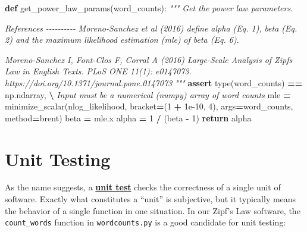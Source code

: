 \documentclass[
]{krantz}
\makeatletter
\newenvironment{Shaded}{\begin{snugshade}}{\end{snugshade}}
\newcommand{\BuiltInTok}[1]{#1}
\newcommand{\CommentTok}[1]{\textcolor[rgb]{0.56,0.35,0.01}{\textit{#1}}}
\newcommand{\ControlFlowTok}[1]{\textcolor[rgb]{0.13,0.29,0.53}{\textbf{#1}}}
\newcommand{\DecValTok}[1]{\textcolor[rgb]{0.00,0.00,0.81}{#1}}
\newcommand{\FloatTok}[1]{\textcolor[rgb]{0.00,0.00,0.81}{#1}}
\newcommand{\KeywordTok}[1]{\textcolor[rgb]{0.13,0.29,0.53}{\textbf{#1}}}
\newcommand{\NormalTok}[1]{#1}
\newcommand{\OperatorTok}[1]{\textcolor[rgb]{0.81,0.36,0.00}{\textbf{#1}}}
\newcommand{\StringTok}[1]{\textcolor[rgb]{0.31,0.60,0.02}{#1}}
\newenvironment{kframe}{%
\medskip{}
\setlength{\fboxsep}{.8em}
 \def\at@end@of@kframe{}%
 \ifinner\ifhmode%
  \def\at@end@of@kframe{\end{minipage}}%
  \begin{minipage}{\columnwidth}%
 \fi\fi%
 \def\FrameCommand##1{\hskip\@totalleftmargin \hskip-\fboxsep
 \colorbox{shadecolor}{##1}\hskip-\fboxsep
     \hskip-\linewidth \hskip-\@totalleftmargin \hskip\columnwidth}%
 \MakeFramed {\advance\hsize-\width
   \@totalleftmargin\z@ \linewidth\hsize
   \@setminipage}}%
 {\par\unskip\endMakeFramed%
 \at@end@of@kframe}
\renewenvironment{Shaded}{\begin{kframe}}{\end{kframe}}
\newcommand{\gref}[2]{\hyperlink{#2}{\textbf{#1}}}
\makeatother
\begin{document}
\begin{Shaded}
\begin{Highlighting}[]
\KeywordTok{def}\NormalTok{ get\_power\_law\_params(word\_counts):}
    \CommentTok{"""}
\CommentTok{    Get the power law parameters.}

\CommentTok{    References}
\CommentTok{    {-}{-}{-}{-}{-}{-}{-}{-}{-}{-}}
\CommentTok{    Moreno{-}Sanchez et al (2016) define alpha (Eq. 1),}
\CommentTok{      beta (Eq. 2) and the maximum likelihood estimation (mle)}
\CommentTok{      of beta (Eq. 6).}

\CommentTok{    Moreno{-}Sanchez I, Font{-}Clos F, Corral A (2016)}
\CommentTok{      Large{-}Scale Analysis of Zipf\textquotesingle{}s Law in English Texts.}
\CommentTok{      PLoS ONE 11(1): e0147073.}
\CommentTok{      https://doi.org/10.1371/journal.pone.0147073}
\CommentTok{    """}
    \ControlFlowTok{assert} \BuiltInTok{type}\NormalTok{(word\_counts) }\OperatorTok{==}\NormalTok{ np.ndarray, }\OperatorTok{\textbackslash{}}
           \CommentTok{\textquotesingle{}Input must be a numerical (numpy) array of word counts\textquotesingle{}}
\NormalTok{    mle }\OperatorTok{=}\NormalTok{ minimize\_scalar(nlog\_likelihood, bracket}\OperatorTok{=}\NormalTok{(}\DecValTok{1} \OperatorTok{+} \FloatTok{1e{-}10}\NormalTok{, }\DecValTok{4}\NormalTok{),}
\NormalTok{                          args}\OperatorTok{=}\NormalTok{word\_counts, method}\OperatorTok{=}\StringTok{\textquotesingle{}brent\textquotesingle{}}\NormalTok{)}
\NormalTok{    beta }\OperatorTok{=}\NormalTok{ mle.x}
\NormalTok{    alpha }\OperatorTok{=} \DecValTok{1} \OperatorTok{/}\NormalTok{ (beta }\OperatorTok{{-}} \DecValTok{1}\NormalTok{)}
    \ControlFlowTok{return}\NormalTok{ alpha}
\end{Highlighting}
\end{Shaded}

\hypertarget{testing-unit}{%
\section{Unit Testing}\label{testing-unit}}

As the name suggests,
a \gref{unit test}{unit\_test}
checks the correctness of a single unit of software.
Exactly what constitutes a ``unit'' is subjective,
but it typically means the behavior of a single function in one situation.
In our Zipf's Law software,
the \texttt{count\_words} function in \texttt{wordcounts.py} is
a good candidate for unit testing:
\end{document}
